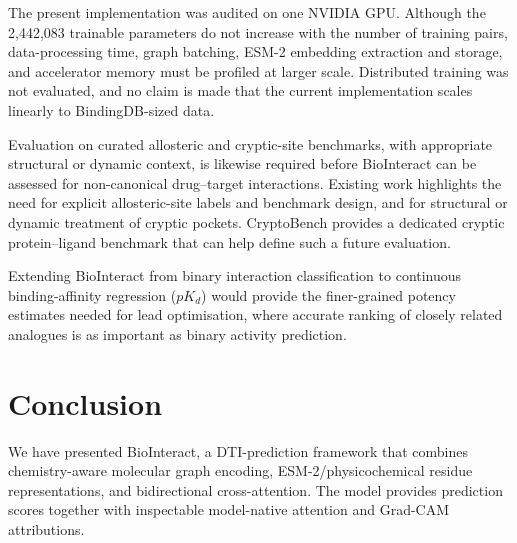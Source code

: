 \documentclass[fleqn,10pt]{wlscirep}
\begin{document}
The present implementation was audited on one NVIDIA GPU. Although the
2{,}442{,}083 trainable parameters do not increase with the number of training
pairs, data-processing time, graph batching, ESM-2 embedding extraction and
storage, and accelerator memory must be profiled at larger scale. Distributed
training was not evaluated, and no claim is made that the current implementation
scales linearly to BindingDB-sized data.

Evaluation on curated allosteric and cryptic-site benchmarks, with appropriate
structural or dynamic context, is likewise required before BioInteract can be
assessed for non-canonical drug--target interactions.  Existing work highlights
the need for explicit allosteric-site labels and benchmark design,\cite{wu2022allostericbenchmark,gatlin2026allostericgrammar}
and for structural or dynamic treatment of cryptic pockets.\cite{zhang2026crypticpockets}
CryptoBench provides a dedicated cryptic protein--ligand benchmark that can help
define such a future evaluation.\cite{skrhak2024cryptobench}

Extending BioInteract from binary interaction classification to
continuous binding-affinity regression ($pK_d$) would provide the finer-grained
potency estimates needed for lead optimisation, where accurate ranking of closely
related analogues is as important as binary activity prediction.

\section{Conclusion}
\label{sec:conclusion}

We have presented BioInteract, a DTI-prediction framework that combines
chemistry-aware molecular graph encoding, ESM-2/physicochemical residue
representations, and bidirectional cross-attention.  The model provides
prediction scores together with inspectable model-native attention and Grad-CAM
attributions.
\end{document}
